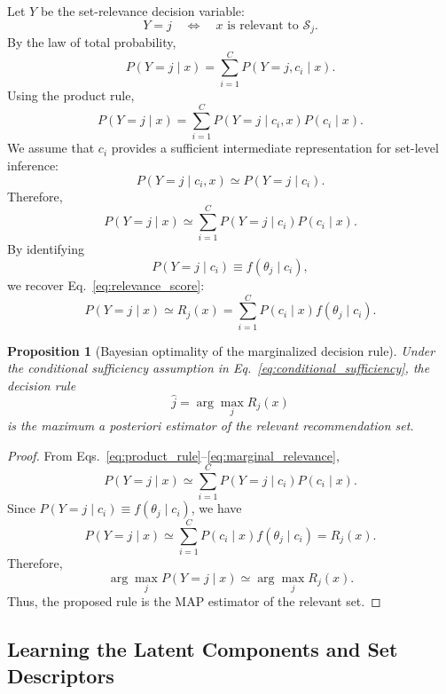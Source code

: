 \documentclass{article}
\theoremstyle{plain}
\newtheorem{proposition}{Proposition}
\theoremstyle{definition}
\theoremstyle{remark}
\begin{document}
Let \(Y\) be the set-relevance decision variable:
\[
Y=j
\quad\Longleftrightarrow\quad
x \text{ is relevant to } \mathcal S_j.
\]
By the law of total probability,
\begin{equation}
	\label{eq:total_probability}
	P(Y=j\mid x)
	=
	\sum_{i=1}^{C}
	P(Y=j,c_i\mid x).
\end{equation}
Using the product rule,
\begin{equation}
	\label{eq:product_rule}
	P(Y=j\mid x)
	=
	\sum_{i=1}^{C}
	P(Y=j\mid c_i,x)P(c_i\mid x).
\end{equation}
We assume that \(c_i\) provides a sufficient intermediate representation for set-level inference:
\begin{equation}
	\label{eq:conditional_sufficiency}
	P(Y=j\mid c_i,x)
	\simeq
	P(Y=j\mid c_i).
\end{equation}
Therefore,
\begin{equation}
	\label{eq:marginal_relevance}
	P(Y=j\mid x)
	\simeq
	\sum_{i=1}^{C}
	P(Y=j\mid c_i)P(c_i\mid x).
\end{equation}
By identifying
\[
P(Y=j\mid c_i)
\equiv
f(\theta_j\mid c_i),
\]
we recover Eq.~\eqref{eq:relevance_score}:
\[
P(Y=j\mid x)
\simeq
R_j(x)
=
\sum_{i=1}^{C}
P(c_i\mid x)f(\theta_j\mid c_i).
\]

\begin{proposition}[Bayesian optimality of the marginalized decision rule]
	\label{prop:bayesian_optimality}
	Under the conditional sufficiency assumption in Eq.~\eqref{eq:conditional_sufficiency}, the decision rule
	\[
	\widehat j
	=
	\arg\max_j R_j(x)
	\]
	is the maximum a posteriori estimator of the relevant recommendation set.
\end{proposition}

\begin{proof}
	From Eqs.~\eqref{eq:product_rule}--\eqref{eq:marginal_relevance},
	\[
	P(Y=j\mid x)
	\simeq
	\sum_{i=1}^{C}
	P(Y=j\mid c_i)P(c_i\mid x).
	\]
	Since \(P(Y=j\mid c_i)\equiv f(\theta_j\mid c_i)\), we have
	\[
	P(Y=j\mid x)
	\simeq
	\sum_{i=1}^{C}
	P(c_i\mid x)f(\theta_j\mid c_i)
	=
	R_j(x).
	\]
	Therefore,
	\[
	\arg\max_j P(Y=j\mid x)
	\simeq
	\arg\max_j R_j(x).
	\]
	Thus, the proposed rule is the MAP estimator of the relevant set.
\end{proof}

\subsection{Learning the Latent Components and Set Descriptors}
\label{subsec:learning_parameters}
\end{document}
